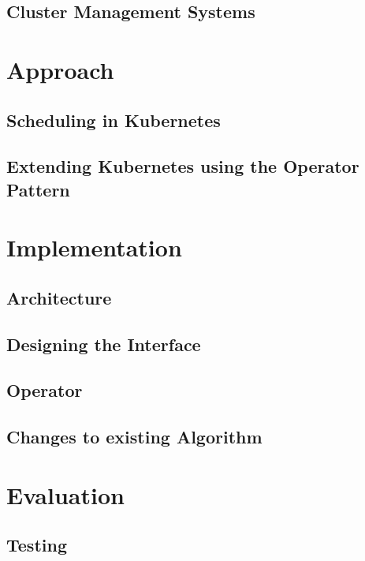 \section{Cluster Management Systems}


\chapter{Approach}
\section{Scheduling in Kubernetes}

\section{Extending Kubernetes using the Operator Pattern}


\chapter{Implementation}
\section{Architecture}

\section{Designing the Interface}

\section{Operator}

\section{Changes to existing Algorithm}


\chapter{Evaluation}
\section{Testing}

